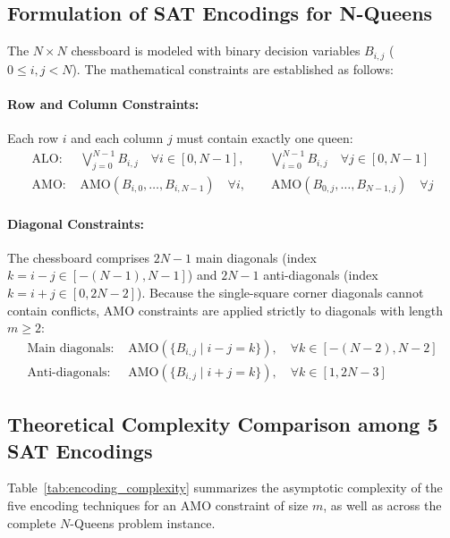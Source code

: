 \documentclass[a4paper,fleqn]{cas-sc}
\begin{document}
\subsection{Formulation of SAT Encodings for N-Queens}
\label{subsec:sat_encodings_nqueens}
The $N \times N$ chessboard is modeled with binary decision variables $B_{i,j}$ ($0 \le i, j < N$). The mathematical constraints are established as follows:

\paragraph{Row and Column Constraints:}
Each row $i$ and each column $j$ must contain exactly one queen:
\begin{align}
\text{ALO: } & \bigvee_{j=0}^{N-1} B_{i,j} \quad \forall i \in [0, N-1], \qquad \bigvee_{i=0}^{N-1} B_{i,j} \quad \forall j \in [0, N-1] \\
\text{AMO: } & \text{AMO}(B_{i,0}, \dots, B_{i,N-1}) \quad \forall i, \qquad \text{AMO}(B_{0,j}, \dots, B_{N-1,j}) \quad \forall j
\end{align}

\paragraph{Diagonal Constraints:}
The chessboard comprises $2N - 1$ main diagonals (index $k = i - j \in [-(N-1), N-1]$) and $2N - 1$ anti-diagonals (index $k = i + j \in [0, 2N-2]$). Because the single-square corner diagonals cannot contain conflicts, AMO constraints are applied strictly to diagonals with length $m \ge 2$:
\begin{align}
\text{Main diagonals: } & \text{AMO}(\{B_{i,j} \mid i - j = k\}), \quad \forall k \in [-(N-2), N-2] \\
\text{Anti-diagonals: } & \text{AMO}(\{B_{i,j} \mid i + j = k\}), \quad \forall k \in [1, 2N-3]
\end{align}

\subsection{Theoretical Complexity Comparison among 5 SAT Encodings}
\label{subsec:complexity_comparison}
Table~\ref{tab:encoding_complexity} summarizes the asymptotic complexity of the five encoding techniques for an AMO constraint of size $m$, as well as across the complete $N$-Queens problem instance.
\end{document}
